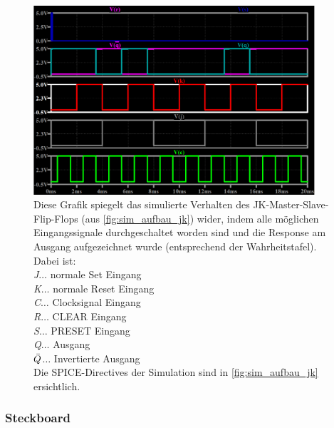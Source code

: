\documentclass[12pt,english,ngerman]{scrartcl}
\begin{document}
\begin{figure}[H]
  \centering
  \includegraphics[width=\linewidth, height=7cm]{./figures/sim/jk/WahrheitstabelleJK.png}
  \caption{Diese Grafik spiegelt das simulierte Verhalten des JK-Master-Slave-Flip-Flops (aus
    \autoref{fig:sim_aufbau_jk}) wider, indem alle möglichen Eingangssignale
    durchgeschaltet worden sind und die Response am Ausgang aufgezeichnet
    wurde (entsprechend der Wahrheitstafel). 
    Dabei ist:\\
    \textit{J}$\dots$ normale Set Eingang\\
    \textit{K}$\dots$ normale Reset Eingang\\
    \textit{C}$\dots$ Clocksignal Eingang\\
    \textit{R}$\dots$ CLEAR Eingang\\
    \textit{S}$\dots$ PRESET Eingang\\
    \textit{Q}$\dots$ Ausgang\\
    \textit{$\Bar{Q}$}$\dots$ Invertierte Ausgang\\
    Die SPICE-Directives der Simulation sind in \autoref{fig:sim_aufbau_jk}
    ersichtlich.}
  \label{fig:sim_jk_wahrheit}
\end{figure}

\subsubsection{Steckboard}
\end{document}
